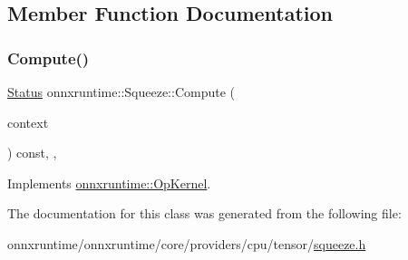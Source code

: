 \subsection{Member Function Documentation}
\mbox{\label{classonnxruntime_1_1Squeeze_a512bf812330bdf483f1b2b4d5a73efde}} 
\subsubsection{\texorpdfstring{Compute()}{Compute()}}
{\footnotesize\ttfamily \mbox{\hyperlink{classonnxruntime_1_1common_1_1Status}{Status}} onnxruntime\+::\+Squeeze\+::\+Compute (\begin{DoxyParamCaption}\item[{\mbox{\hyperlink{classonnxruntime_1_1OpKernelContext}{Op\+Kernel\+Context}} $\ast$}]{context }\end{DoxyParamCaption}) const\hspace{0.3cm}{\ttfamily [inline]}, {\ttfamily [override]}, {\ttfamily [virtual]}}



Implements \mbox{\hyperlink{classonnxruntime_1_1OpKernel_a9eca8656a78b1b3ab9d3351a12798650}{onnxruntime\+::\+Op\+Kernel}}.



The documentation for this class was generated from the following file\+:\begin{DoxyCompactItemize}
\item 
onnxruntime/onnxruntime/core/providers/cpu/tensor/\mbox{\hyperlink{cpu_2tensor_2squeeze_8h}{squeeze.\+h}}\end{DoxyCompactItemize}
